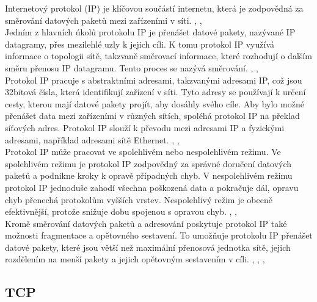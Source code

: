 \documentclass[12pt]{report}			%
\begin{document}
				
Internetový protokol (IP) je klíčovou součástí internetu, která je zodpovědná za směrování datových paketů mezi zařízeními v síti. \cite{IP2}, \cite{IP3}, \cite{IP4}
\\
Jedním z hlavních úkolů protokolu IP je přenášet datové pakety, nazývané IP datagramy, přes mezilehlé uzly k jejich cíli. K tomu protokol IP využívá informace o topologii sítě, takzvaně směrovací informace, které rozhodují o dalším směru přenosu IP datagramu. Tento proces se nazývá směrování. \cite{IP2}, \cite{IP3}, \cite{IP4}
\\
Protokol IP pracuje s abstraktními adresami, takzvanými adresami IP, což jsou 32bitová čísla, která identifikují zařízení v síti. Tyto adresy se používají k určení cesty, kterou mají datové pakety projít, aby dosáhly svého cíle. Aby bylo možné přenášet data mezi zařízeními v různých sítích, spoléhá protokol IP na překlad síťových adres. Protokol IP slouží k převodu mezi adresami IP a fyzickými adresami, například adresami sítě Ethernet. \cite{IP2}, \cite{IP3}, \cite{IP4}
\\
Protokol IP může pracovat ve spolehlivém nebo nespolehlivém režimu. Ve spolehlivém režimu je protokol IP zodpovědný za správné doručení datových paketů a podnikne kroky k opravě případných chyb. V nespolehlivém režimu protokol IP jednoduše zahodí všechna poškozená data a pokračuje dál, opravu chyb přenechá protokolům vyšších vrstev. Nespolehlivý režim je obecně efektivnější, protože snižuje dobu spojenou s opravou chyb. \cite{IP2}, \cite{IP3}, \cite{IP4}
\\
Kromě směrování datových paketů a adresování poskytuje protokol IP také možnosti fragmentace a opětovného sestavení. To umožňuje protokolu IP přenášet datové pakety, které jsou větší než maximální přenosová jednotka sítě, jejich rozdělením na menší pakety a jejich opětovným sestavením v cíli. \cite{IP1}, \cite{IP2}, \cite{IP3}, \cite{IP4}


				\subsection{TCP}
				
\end{document}
